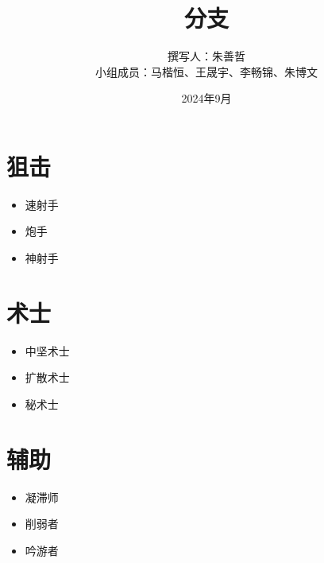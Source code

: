 \documentclass[a4paper,12pt]{article}
\begin{document}
	\title{分支}
	\author{撰写人：朱善哲\\小组成员：马楷恒、王晟宇、李畅锦、朱博文}
	\date{2024年9月}
	\maketitle
	\section{狙击}
		\begin{itemize}
			\item 速射手
			\item 炮手
			\item 神射手
		\end{itemize}
	\section{术士}
		\begin{itemize}
			\item 中坚术士
			\item 扩散术士
			\item 秘术士
		\end{itemize}
	\section{辅助}
		\begin{itemize}
			\item 凝滞师
			\item 削弱者
			\item 吟游者
		\end{itemize}
\end{document}
